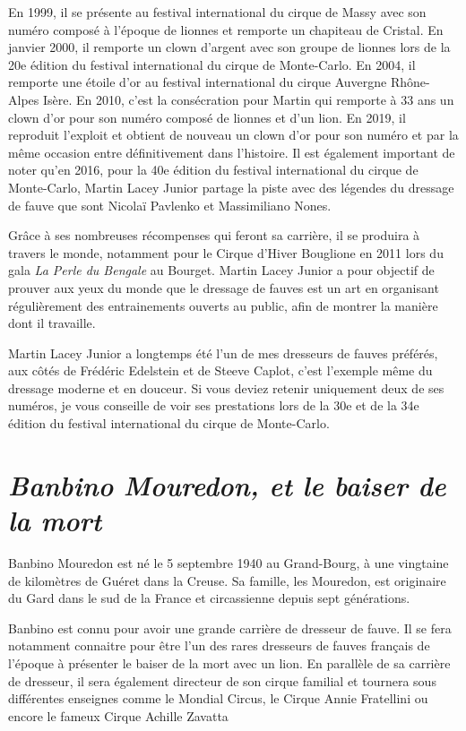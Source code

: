 En 1999, il se présente au festival international du cirque de Massy avec son numéro composé à l'époque de lionnes et remporte un chapiteau de Cristal. En janvier 2000, il remporte un clown d'argent avec son groupe de lionnes lors de la 20e édition du festival international du cirque de Monte-Carlo. En 2004, il remporte une étoile d'or au festival international du cirque Auvergne Rhône-Alpes Isère. En 2010, c'est la consécration pour Martin qui remporte à 33 ans un clown d'or pour son numéro composé de lionnes et d’un lion. En 2019, il reproduit l'exploit et obtient de nouveau un clown d'or pour son numéro et par la même occasion entre définitivement dans l'histoire. Il est également important de noter qu'en 2016, pour la 40e édition du festival international du cirque de Monte-Carlo, Martin Lacey Junior partage la piste avec des légendes du dressage de fauve que sont Nicolaï Pavlenko et Massimiliano Nones.

Grâce à ses nombreuses récompenses qui feront sa carrière, il se produira à travers le monde, notamment pour le Cirque d'Hiver Bouglione en 2011 lors du gala \textit{La Perle du Bengale} au Bourget. Martin Lacey Junior a pour objectif de prouver aux yeux du monde que le dressage de fauves est un art en organisant régulièrement des entrainements ouverts au public, afin de montrer la manière dont il travaille.

Martin Lacey Junior a longtemps été l'un de mes dresseurs de fauves préférés, aux côtés de Frédéric Edelstein et de Steeve Caplot, c'est l'exemple même du dressage moderne et en douceur. Si vous deviez retenir uniquement deux de ses numéros, je vous conseille de voir ses prestations lors de la 30e et de la 34e édition du festival international du cirque de Monte-Carlo.

\section*{\textit{Banbino Mouredon, et le baiser de la mort}}

Banbino Mouredon est né le 5 septembre 1940 au Grand-Bourg, à une vingtaine de kilomètres de Guéret dans la Creuse. Sa famille, les Mouredon, est originaire du Gard dans le sud de la France et circassienne depuis sept générations.

Banbino est connu pour avoir une grande carrière de dresseur de fauve. Il se fera notamment connaitre pour être l'un des rares dresseurs de fauves français de l'époque à présenter le baiser de la mort avec un lion. En parallèle de sa carrière de dresseur, il sera également directeur de son cirque familial et tournera sous différentes enseignes comme le Mondial Circus, le Cirque Annie Fratellini ou encore le fameux Cirque Achille Zavatta

